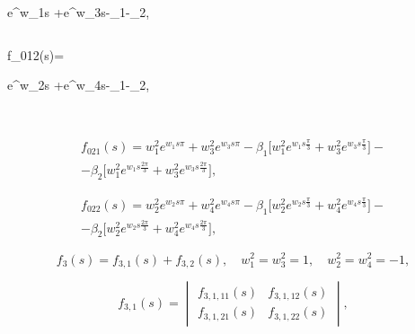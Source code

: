 e^{w_1s\pi} +e^{w_3s\pi}-\alpha_1-\alpha_2,

$$

$$

f_{012}(s)=

e^{w_2s\pi} +e^{w_4s\pi}-\alpha_1-\alpha_2,

$$

\begin{multline}

f_{021}(s)=

w^2_1e^{w_1s\pi} +w^2_3e^{w_3s\pi}-\beta_1

\Big[w^2_1e^{w_1s\frac\pi3}+

w^2_3e^{w_3s\frac\pi3}\Big]-\\-\beta_2\Big[w^2_1e^{w_1s\frac{2\pi}3}+

w^2_3e^{w_3s\frac{2\pi}3}\Big],

\end{multline}

\begin{multline}

f_{022}(s)=

w^2_2e^{w_2s\pi} +w^2_4 e^{w_4s\pi}-\beta_1

\Big[w^2_2 e^{w_2s\frac\pi3}+

w^2_4 e^{w_4s\frac\pi3}\Big]-\\-\beta_2\Big[w^2_2 e^{w_2s\frac{2\pi}3}+

w^2_4 e^{w_4s\frac{2\pi}3}\Big],

\end{multline}

\begin{equation}

\label{mitr:eq22}

f_3(s)=f_{3,1}(s)+f_{3,2}(s), \quad w^2_1=w^2_3=1, \quad w^2_2=w^2_4=-1,

\end{equation}

\begin{equation}

\label{mitr:eq22}

f_{3,1}(s)= \begin{vmatrix}

f_{3,1,11} (s) &f_{3,1,12} (s)\\

f_{3,1,21} (s) &f_{3,1,22}(s)

\end{vmatrix},

\end{equation}


